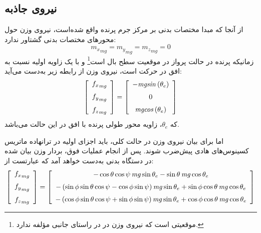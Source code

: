 \subsection{نیروی جاذبه}
از آنجا که مبدا مختصات بدنی بر مرکز جرم پرنده واقع شده‌است، نیروی وزن حول محور‌های مختصات بدنی گشتاور ندارد:
\begin{equation}
 {m_x}_{mg}={m_y}_{mg} ={m_z}_{mg} =0
\end{equation}
زمانیکه پرنده در حالت پرواز در موقعیت سطح بال است\footnote{موقعیتی است که نیروی وزن در در راستای جانبی مؤلفه ندارد.} و با یک زاویه اولیه نسبت به افق در حرکت است، نیروی وزن از رابطه زیر به‌دست می‌آید:
\begin{equation}
\left[ \begin {array}{c} {f_x}_{{{\it mg}}}\\ \noalign{\medskip}{f_y}_{{{\it 
mg}}}\\ \noalign{\medskip}{f_z}_{{{\it mg}}}\end {array} \right] = \left[ 
\begin {array}{c} -{\it mgsin} \left( \theta_{{e}} \right) 
\\ \noalign{\medskip}0\\ \noalign{\medskip}{\it mgcos} \left( \theta_{
{e}} \right) \end {array} \right]
\end{equation}
که $\theta_e$، زاویه محور طولی پرنده با افق در این حالت می‌باشد. 

اما برای بیان نیروی وزن در حالت کلی، باید اجزای اولیه در ترانهاده ماتریس کسینوس‌های هادی پیش‌ضرب شوند.
پس از انجام عملیات فوق، بردار وزن بیان شده در دستگاه بدنی به‌دست خواهد آمد که عبارتست از:
\begin{equation}
 \left[ \begin {array}{c} {f_x}_{{mg}}\\ \noalign{\medskip}{f_y}_{{mg}}
\\ \noalign{\medskip}{f_z}_{{mg}}\end {array} \right] = \left[ 
\begin {array}{c} -\cos{\theta} \cos{\psi} \,{\it mg}\sin{\theta _e}-\sin\theta \,{
\it mg}\cos{\theta _e}\\ \noalign{\medskip}- \left( \sin{\phi} \sin{\theta} \cos{
\psi} -\cos{\phi} \sin{\psi}  \right) {\it mg}\sin{\theta_e}+\sin{\phi} \cos{\theta} \,{
\it mg}\cos{\theta_e}\\ \noalign{\medskip}- \left( \cos{\phi} \sin{\theta} \cos{
\psi} +\sin{\phi} \sin{\psi}  \right) {\it mg}\sin{\theta_e}+\cos{\phi} \cos{\theta} \,{
\it mg}\cos{\theta_e}\end {array} \right] 
\end{equation}
